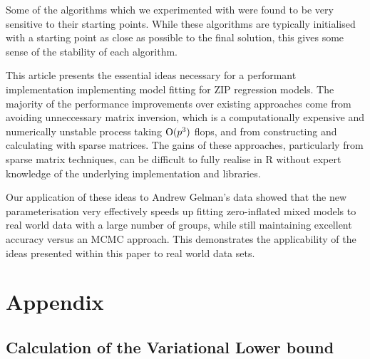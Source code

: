 \documentclass{amsart}[12pt]
\begin{document}
	Some of the algorithms which we experimented with were found to be very sensitive to their starting points.
	While these algorithms are typically initialised with a starting point as close as possible to the final
	solution, this gives some sense of the stability of each algorithm.
		
	This article presents the essential ideas necessary for a performant implementation implementing model fitting
	for ZIP regression models.%
	The majority of the performance
	improvements over existing approaches come from avoiding unneccessary matrix inversion, which is a
	computationally expensive and numerically unstable process taking $\text{O}(p^3)$ flops, and from constructing and 
	calculating	with sparse matrices. The gains of these approaches, particularly from sparse matrix techniques, 
	can be difficult to fully realise in R without expert knowledge of the underlying implementation and libraries.
		
	Our application of these ideas to Andrew Gelman's data showed that the new parameterisation very effectively
	speeds up fitting zero-inflated mixed models to real world data with a large number of groups, while still
	maintaining excellent accuracy versus an MCMC approach. This demonstrates the applicability of the ideas
	presented within this paper to real world data sets.
		
	\newpage
	\section{Appendix} 
	\subsection{Calculation of the Variational Lower bound}
		
\end{document}
